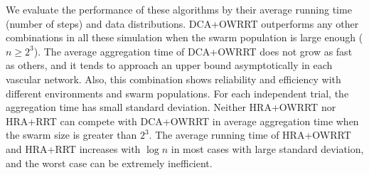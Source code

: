 We evaluate the performance of these algorithms by their average running time (number of steps) and data distributions. 
DCA+OWRRT outperforms any other combinations in all these simulation when the swarm population is large enough ($n \ge 2^3$). 
The average aggregation time of DCA+OWRRT does not grow as fast as others, and it tends to approach an upper bound asymptotically in each vascular network. 
Also, this combination shows reliability and efficiency with different environments and swarm populations. 
For each independent trial, the aggregation time has small standard deviation. 
Neither HRA+OWRRT nor HRA+RRT can compete with DCA+OWRRT in average aggregation time when the swarm size is greater than $2^3$. 
The average running time of HRA+OWRRT and HRA+RRT increases with $\log n$ in most cases with large standard deviation, and the worst case can be extremely inefficient.         
%	



%	








%	
%
%
%	
%
%	




